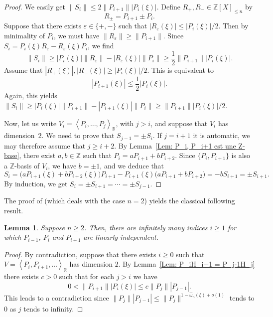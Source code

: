 \documentclass[10pt,a4paper]{amsart}
\numberwithin{equation}{section}
\newcommand\bR{\mathbb{R}}
\newcommand\bZ{\mathbb{Z}}
\newcommand\ee{\varepsilon}
\newcommand\homega{\widehat{\omega}}\newcommand\HH{\mathcal{H}}
\newcommand{\normH}[1]{\|#1\|}
\newcommand{\Vect}[2][]{\left\la #2\right\ra_{#1}}
\let\la\langle
\let\ra\rangle
\theoremstyle{definition}
\theoremstyle{plain}
\newtheorem{Lem}[Def]{Lemma}
\begin{document}
\begin{proof}
We easily get $\normH{S_i} \leq 2\normH{P_{i+1}}|P_i(\xi)|$. Define $R_+, R_- \in\bZ[X]_{\leq n}$ by
\[
R_\pm = P_{i+1} \pm P_i.
\]
Suppose that there exists $\ee\in\{+,-\}$ such that $|R_\ee(\xi)| \leq |P_i(\xi)|/2$. Then by minimality of $P_i$, we must have $\normH{R_\ee} \geq \normH{P_{i+1}}$. Since $S_i = P_i(\xi)R_\ee - R_\ee(\xi) P_i$, we find
\begin{equation*}
\normH{S_i} \geq |P_i(\xi)|\normH{R_\ee} - |R_\ee(\xi)|\normH{P_i} \geq \frac{1}{2} \normH{P_{i+1}}|P_i(\xi)|.
\end{equation*}
Assume that $|R_+(\xi)|, |R_-(\xi)| \geq |P_i(\xi)|/2$. This is equivalent to
\[
|P_{i+1}(\xi)| \leq \frac{1}{2}|P_i(\xi)|.
\]
Again, this yields $\normH{S_i} \geq |P_i(\xi)|\normH{P_{i+1}} - |P_{i+1}(\xi)|\normH{P_i} \geq \normH{P_{i+1}}|P_i(\xi)|/2$.

Now, let us write $V_i = \Vect[\bR]{P_i,\dots,P_j}$, with $j > i$, and suppose that $V_i$ has dimension~$2$. We need to prove that $S_{j-1} = \pm S_i$. If $j=i+1$ it is automatic, we may therefore assume that $j\geq i+2$. By Lemma~\ref{Lem: P_i, P_i+1 est une Z-base}, there exist $a,b\in\bZ$ such that $P_i = aP_{i+1} + bP_{i+2}$. Since $\{P_i,P_{i+1}\}$ is also a $\bZ$-basis of $V_i$, we have $b=\pm 1$, and we deduce that
\[
S_i = \big(aP_{i+1}(\xi) + bP_{i+2}(\xi)\big)P_{i+1} - P_{i+1}(\xi)\big(aP_{i+1} + bP_{i+2}\big) = -bS_{i+1} = \pm S_{i+1}.
\]
By induction, we get $S_i = \pm S_{i+1} = \cdots = \pm S_{j-1}$.
\end{proof}

The proof of \cite[Lem.\,3]{davenport1967approximation} (which deals with the case $n=2$) yields the classical following result.

\begin{Lem}
\label{lem: I infini}
Suppose $n\geq 2$. Then, there are infinitely many indices $i\geq 1$ for which $P_{i-1}$, $P_i$ and $P_{i+1}$ are linearly independent.
\end{Lem}

\begin{proof}
By contradiction, suppose that there exists $i\geq 0$ such that $V=\Vect[\bR]{P_i,P_{i+1},\dots}$ has dimension $2$. By Lemma~\ref{Lem: P_iH_i+1 = P_j-1H_j} there exists $c>0$ such that for each $j > i$ we have
\[
0 < \normH{P_{i+1}}|P_i(\xi)| \leq c\normH{P_j}|P_{j-1}|.
\]
This leads to a contradiction since $\normH{P_j}|P_{j-1}| \leq \normH{P_j}^{1-\homega_n(\xi)+o(1)}$ tends to $0$ as $j$ tends to infinity.
\end{proof}
\end{document}

